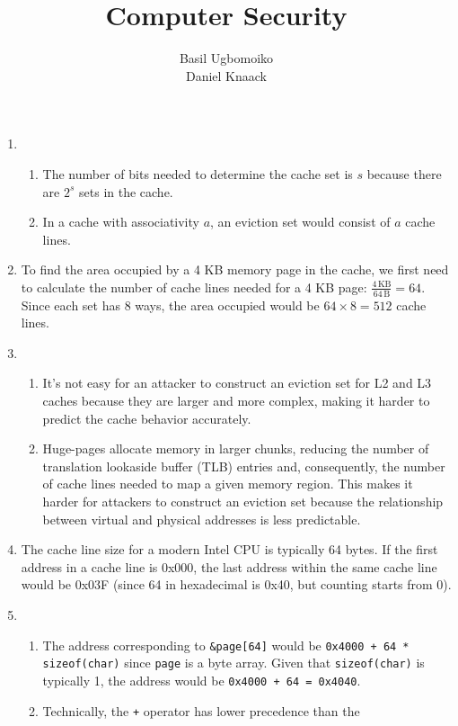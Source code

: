 \documentclass[sheet=2, prefix, english]{dexercise}
\title{Computer Security}
\author{Basil Ugbomoiko\\Daniel Knaack}
\begin{document}
\task[Caches]

\begin{enumerate}
  \item
    \begin{enumerate}
      \item
        The number of bits needed to determine the cache set is $s$ because
        there are $2^s$ sets in the cache.
      \item
        In a cache with associativity $a$, an eviction set would consist of $a$
        cache lines.
    \end{enumerate}
  \item
    To find the area occupied by a 4 KB memory page in the cache, we first need
    to calculate the number of cache lines needed for a 4 KB page: $\frac{4\,
    \text{KB}}{64\, \text{B}} = 64$.
    Since each set has 8 ways, the area occupied would be $64 \times 8 = 512$
    cache lines.
  \item
    \begin{enumerate}
      \item
        It's not easy for an attacker to construct an eviction set for L2 and
        L3 caches because they are larger and more complex, making it harder to
        predict the cache behavior accurately.
      \item
        Huge-pages allocate memory in larger chunks, reducing the number of
        translation lookaside buffer (TLB) entries and, consequently, the
        number of cache lines needed to map a given memory region.
        This makes it harder for attackers to construct an eviction set because
        the relationship between virtual and physical addresses is less
        predictable.
    \end{enumerate}
  \item
    The cache line size for a modern Intel CPU is typically 64 bytes.
    If the first address in a cache line is 0x000, the last address within the
    same cache line would be 0x03F (since 64 in hexadecimal is 0x40, but
    counting starts from 0).
  \item
    \begin{enumerate}
      \item
        The address corresponding to \texttt{\&page[64]} would be
        \texttt{0x4000 + 64 * sizeof(char)} since \texttt{page} is a byte
        array. Given that \texttt{sizeof(char)} is typically 1, the address
        would be \texttt{0x4000 + 64 = 0x4040}.
      \item
        Technically, the \texttt{+} operator has lower precedence than the

\end{enumerate}
\end{enumerate}
\end{document}
